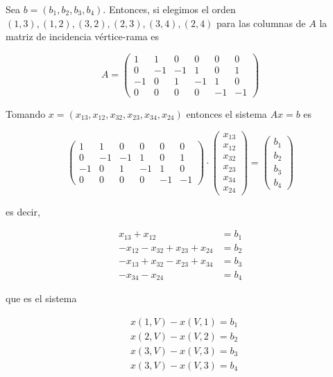 \documentclass[10pt]{article}
\begin{document}
Sea $b=\left(b_{1}, b_{2}, b_{3}, b_{4}\right)$. Entonces, si elegimos el orden $(1,3),(1,2),(3,2),(2,3),(3,4),(2,4)$ para las columnas de $A$ la matriz de incidencia vértice-rama es

$$
A=\left(\begin{array}{cccccc}
1 & 1 & 0 & 0 & 0 & 0 \\
0 & -1 & -1 & 1 & 0 & 1 \\
-1 & 0 & 1 & -1 & 1 & 0 \\
0 & 0 & 0 & 0 & -1 & -1
\end{array}\right)
$$

Tomando $x=\left(x_{13}, x_{12}, x_{32}, x_{23}, x_{34}, x_{24}\right)$ entonces el sistema $A x=b$ es

$$
\left(\begin{array}{cccccc}
1 & 1 & 0 & 0 & 0 & 0 \\
0 & -1 & -1 & 1 & 0 & 1 \\
-1 & 0 & 1 & -1 & 1 & 0 \\
0 & 0 & 0 & 0 & -1 & -1
\end{array}\right) \cdot\left(\begin{array}{c}
x_{13} \\
x_{12} \\
x_{32} \\
x_{23} \\
x_{34} \\
x_{24}
\end{array}\right)=\left(\begin{array}{c}
b_{1} \\
b_{2} \\
b_{3} \\
b_{4}
\end{array}\right)
$$

es decir,

$$
\begin{aligned}
x_{13}+x_{12} & =b_{1} \\
-x_{12}-x_{32}+x_{23}+x_{24} & =b_{2} \\
-x_{13}+x_{32}-x_{23}+x_{34} & =b_{3} \\
-x_{34}-x_{24} & =b_{4}
\end{aligned}
$$

que es el sistema

$$
\begin{aligned}
& x(1, V)-x(V, 1)=b_{1} \\
& x(2, V)-x(V, 2)=b_{2} \\
& x(3, V)-x(V, 3)=b_{3} \\
& x(3, V)-x(V, 3)=b_{4}
\end{aligned}
$$
\end{document}
